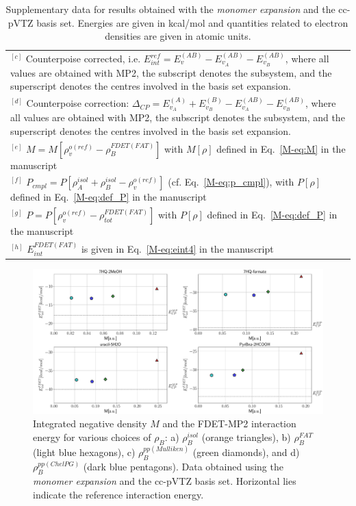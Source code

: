 \documentclass[amsmath,amssymb,preprint,aip,jcp]{revtex4-1}
\begin{document}
\begin{table}[H]
\begin{center}
{\begin{tabular}{|l|l|l|l|l|l|l|l|l|l|}
\multicolumn{10}{p{1.0\textwidth}}{$^{[c]}$ Counterpoise corrected, i.e. $E_{int}^{ref} = E_{v}^{(AB)} - E_{v_A}^{(AB)} - E_{v_B}^{(AB)}$, where all values are obtained with MP2, the subscript denotes the subsystem, and the superscript denotes the centres involved in the basis set expansion.} \\
\multicolumn{10}{p{1.0\textwidth}}{$^{[d]}$ Counterpoise correction: $\Delta_{CP} = E_{v_A}^{(A)} + E_{v_B}^{(B)} - E_{v_A}^{(AB)} - E_{v_B}^{(AB)}$, where all values are obtained with MP2, the subscript denotes the subsystem, and the superscript denotes the centres involved in the basis set expansion.} \\
\multicolumn{10}{p{1.0\textwidth}}{$^{[e]}$ $M=M[\rho_v^{o(ref)} - \rho^{FDET(FAT)}_{B}]$ with $M[\rho]$ defined in Eq.~\ref{M-eq:M} in the manuscript}\\
\multicolumn{10}{p{1.0\textwidth}}{$^{[f]}$ $P_{cmpl}=P[\rho_A^{isol}+\rho_B^{isol} - \rho_v^{o(ref)}]$ (cf. Eq.~\ref{M-eq:p_cmpl}), with $P[\rho]$ defined in Eq.~\ref{M-eq:def_P} in the manuscript}\\
\multicolumn{10}{p{1.0\textwidth}}{$^{[g]}$ $P=P[\rho_v^{o(ref)} - \rho_{tot}^{FDET(FAT)}]$ with $P[\rho]$ defined in Eq.~\ref{M-eq:def_P} in the manuscript}\\
\multicolumn{10}{p{1.0\textwidth}}{$^{[h]}$ $E^{FDET(FAT)}_{int}$ is given in Eq.~\ref{M-eq:eint4} in the manuscript}\\
\end{tabular}
}
\end{center}
\caption{Supplementary data for results obtained with the \textit{monomer expansion} and the cc-pVTZ basis set. Energies are given in kcal/mol and quantities related to electron densities are given in atomic units.}
\end{table}

\begin{figure}
\centering
\includegraphics[width=1.0\linewidth]{M_vs_MP_ccpVTZ.pdf}
\caption{Integrated negative density $M$ and the FDET-MP2 interaction energy for various choices of $\rho_B$: a) $\rho_B^{isol}$ (orange triangles), b) $\rho_B^{FAT}$ (light blue hexagons), c) $\rho_B^{pp(Mulliken)}$ (green diamonds), and d) $\rho_B^{pp(ChelPG)}$ (dark blue pentagons). Data obtained using the {\it monomer expansion} and the cc-pVTZ basis set. Horizontal lies indicate the reference interaction energy.}
\label{fig:M_vs_MP_ccpVTZ}
\end{figure}
\end{document}
